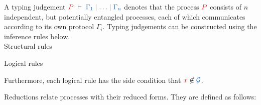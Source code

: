 \documentclass[UKenglish]{llncs}
\begin{document}
\begin{definition}\label{def:cp-typing-judgement}
  A typing judgement $\seq[P]{\Gamma_1 \hsep \dots \hsep \Gamma_n}$ denotes that the process $\tm{P}$ consists of $n$ independent, but potentially entangled processes, each of which communicates according to its own protocol $\Gamma_i$. 
  Typing judgements can be constructed using the inference rules below. 
  \\[0.5\baselineskip]
  {Structural rules}
  \begin{center}
    \hcpInfAx
    \hcpInfCut
  \end{center}
  \begin{center}
    \hcpInfMix
    \hcpInfHalt
  \end{center}
  {Logical rules}
  \begin{center}
    \hcpInfBoundTens
    \hcpInfParr
  \end{center}
  \begin{center}
    \hcpInfOne
    \hcpInfBot
  \end{center}
  \begin{center}
  \end{center}
  \begin{center}
    \hcpInfWith
  \end{center}
  \begin{center}
    \hcpInfNil
    \hcpInfTop
  \end{center}
  Furthermore, each logical rule has the side condition that $\tm{x} \not\in \ty{\mathcal{G}}$.
\end{definition}
Reductions relate processes with their reduced forms.
They are defined as follows:
\end{document}
